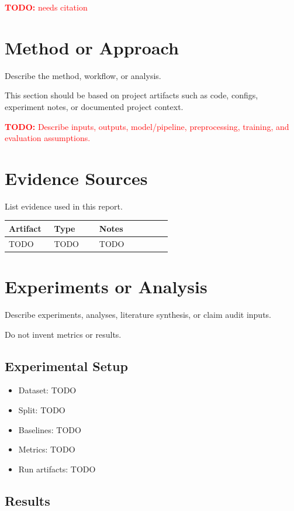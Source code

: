 \documentclass[11pt]{article}
\newcommand{\todo}[1]{\textcolor{red}{\textbf{TODO:} #1}}
\newcommand{\needcitation}{\todo{needs citation}}
\begin{document}
\needcitation

\section{Method or Approach}

Describe the method, workflow, or analysis.

This section should be based on project artifacts such as code, configs, experiment notes, or documented project context.

\todo{Describe inputs, outputs, model/pipeline, preprocessing, training, and evaluation assumptions.}

\section{Evidence Sources}

List evidence used in this report.

\begin{longtable}{p{0.25\linewidth} p{0.25\linewidth} p{0.4\linewidth}}
\toprule
\textbf{Artifact} & \textbf{Type} & \textbf{Notes} \\
\midrule
TODO & TODO & TODO \\
\bottomrule
\end{longtable}

\section{Experiments or Analysis}

Describe experiments, analyses, literature synthesis, or claim audit inputs.

Do not invent metrics or results.

\subsection{Experimental Setup}

\begin{itemize}[leftmargin=*]
    \item Dataset: TODO
    \item Split: TODO
    \item Baselines: TODO
    \item Metrics: TODO
    \item Run artifacts: TODO
\end{itemize}

\subsection{Results}
\end{document}
